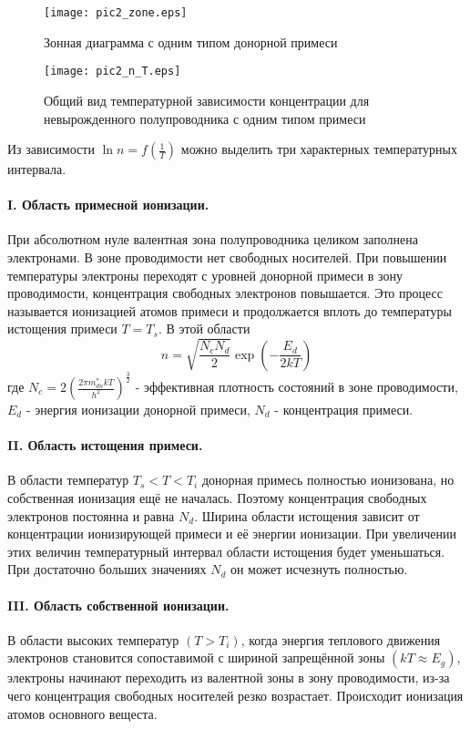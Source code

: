 \begin{figure}[h!]\centering
\texttt{[image: pic2\_zone.eps]}
\caption{Зонная диаграмма с одним типом донорной примеси}
\label{pic2_zone}
\end{figure}

\begin{figure}[h!]\centering
\texttt{[image: pic2\_n\_T.eps]}
\caption{Общий вид температурной зависимости концентрации для невырожденного полупроводника с одним типом примеси}
\label{pic2_n_T}
\end{figure}

Из зависимости $\ln n = f(\frac{1}{T})$ можно выделить три характерных температурных интервала.

\paragraph{I. Область примесной ионизации.}
При абсолютном нуле валентная зона полупроводника целиком заполнена электронами. В зоне проводимости нет свободных носителей. При повышении температуры электроны переходят с уровней донорной примеси в зону проводимости, концентрация свободных электронов повышается. Это процесс называется ионизацией атомов примеси и продолжается вплоть до температуры истощения примеси $T = T_{s}$. В этой области
\begin{equation}
n = \sqrt{\frac{N_{c}N_{d}}{2}} \exp{\left( -\frac{E_{d}}{2 k T} \right)}
\label{eq2_n_T}
\end{equation}
где $N_{c} = 2 \left( \frac{2 \pi m_{dn}^{*} k T}{h^2} \right) ^ \frac{3}{2}$ - эффективная плотность состояний в зоне проводимости, $E_{d}$ - энергия ионизации донорной примеси, $N_{d}$ - концентрация примеси.

\paragraph{II. Область истощения примеси.}
В области температур $T_{s} < T < T_{i}$ донорная примесь полностью ионизована, но собственная ионизация ещё не началась. Поэтому концентрация свободных электронов постоянна и равна $N_{d}$.
Ширина области истощения зависит от концентрации ионизирующей примеси и её энергии ионизации. При увеличении этих величин температурный интервал области истощения будет уменьшаться. При достаточно больших значениях $N_{d}$ он может исчезнуть полностью.

\paragraph{III. Область собственной ионизации.}
В области высоких температур $(T > T_{i})$, когда энергия теплового движения электронов становится сопоставимой с шириной запрещённой зоны $(k T \approx E_{g})$, электроны начинают переходить из валентной зоны в зону проводимости, из-за чего концентрация свободных носителей резко возрастает. Происходит ионизация атомов основного вещеста.

